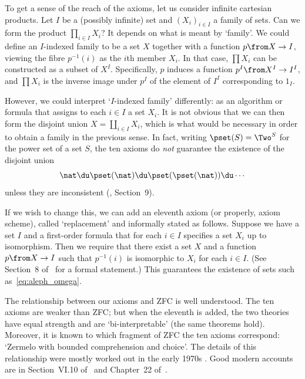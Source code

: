 \documentclass[12pt]{article}
\begin{document}
To get a sense of the reach of the axioms, let us consider infinite
cartesian products.  Let $I$ be a (possibly infinite) set and $(X_i)_{i \in
  I}$ a family of sets.  Can we form the product $\prod_{i \in I} X_i$?
It depends on what is meant by `family'.  We could define an
$I$-indexed family to be a set $X$ together with a function $p\from X \to
I$, viewing the fibre $p^{-1}(i)$ as the $i$th member $X_i$.  In that case,
$\prod X_i$ can be constructed as a subset of $X^I$.  Specifically, $p$
induces a function $p^I \from X^I \to I^I$, and $\prod X_i$ is the inverse
image under $p^I$ of the element of $I^I$ corresponding to $1_I$.

However, we could interpret `$I$-indexed family' differently: as an
algorithm or formula that assigns to each $i \in I$ a set $X_i$.  It is not
obvious that we can then form the disjoint union $X = \coprod_{i \in I}
X_i$, which is what would be necessary in order to obtain a family in the
previous sense.  In fact, writing $\pset(S) = \Two^S$ for the power set of
a set $S$, the ten axioms do \emph{not} guarantee the existence of the
disjoint union
% 
\begin{equation}        \label{eq:aleph_omega}
\nat \du \pset(\nat) \du \pset(\pset(\nat)) 
\du \cdots 
\end{equation}
% 
unless they are inconsistent (\cite{MathSML}, Section~9).

If we wish to change this, we can add an eleventh axiom (or properly, axiom
scheme), called `replacement' and informally stated as follows.  Suppose we
have a set $I$ and a first-order formula that for each $i \in I$ specifies
a set $X_i$ up to isomorphism.  Then we require that there exist a set $X$
and a function $p \from X \to I$ such that $p^{-1}(i)$ is isomorphic to
$X_i$ for each $i \in I$.  (See Section~8 of~\cite{McLaECS} for a formal
statement.)  This guarantees the existence of sets such
as~\eqref{eq:aleph_omega}.

The relationship between our axioms and ZFC is well understood.  The ten
axioms are weaker than ZFC; but when the eleventh is added, the two
theories have equal strength and are `bi-interpretable' (the same theorems
hold).  Moreover, it is known to which fragment of ZFC the ten axioms
correspond: `Zermelo with bounded comprehension and choice'.  The details
of this relationship were mostly worked out in the early 1970s
\cite{Cole,MitcBTT,Osiu}.  Good modern accounts are in Section~VI.10
of~\cite{MaMo} and Chapter~22 of~\cite{McLaECET}.

\end{document}
